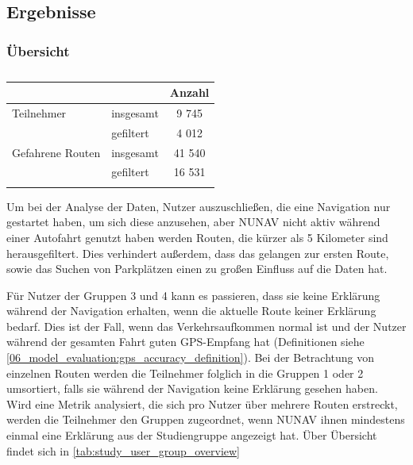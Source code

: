 \subsection{Ergebnisse}

\subsubsection{Übersicht}

\begin{longtable}{|l|l|c|}
    \hline
                        &           & \textbf{Anzahl} \\ \hline
    Teilnehmer          & insgesamt & 9 745 \\
                        & gefiltert & 4 012 \\ \hline
    Gefahrene Routen    & insgesamt & 41 540 \\
                        & gefiltert & 16 531 \\ \hline
\caption{}
\label{tab:study_user_overview}
\end{longtable}

Um bei der Analyse der Daten, Nutzer auszuschließen, die eine Navigation nur gestartet haben, um sich diese anzusehen, aber NUNAV nicht aktiv während einer Autofahrt genutzt haben werden Routen, die kürzer als 5 Kilometer sind herausgefiltert. Dies verhindert außerdem, dass das gelangen zur ersten Route, sowie das Suchen von Parkplätzen einen zu großen Einfluss auf die Daten hat.

Für Nutzer der Gruppen 3 und 4 kann es passieren, dass sie keine Erklärung während der Navigation erhalten, wenn die aktuelle Route keiner Erklärung bedarf. Dies ist der Fall, wenn das Verkehrsaufkommen \glqq normal\grqq{} ist und der Nutzer während der gesamten Fahrt guten GPS-Empfang hat (Definitionen siehe \autoref{06_model_evaluation:gps_accuracy_definition}). Bei der Betrachtung von einzelnen Routen werden die Teilnehmer folglich in die Gruppen 1 oder 2 umsortiert, falls sie während der Navigation keine Erklärung gesehen haben. Wird eine Metrik analysiert, die sich pro Nutzer über mehrere Routen erstreckt, werden die Teilnehmer den Gruppen zugeordnet, wenn NUNAV ihnen mindestens einmal eine Erklärung aus der Studiengruppe angezeigt hat. Über Übersicht findet sich in \autoref{tab:study_user_group_overview}

